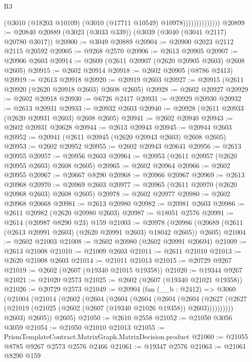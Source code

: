 \begin{lexlean}{R3}
\begin{coremodule}
                            (@3010 (@18203 @10109) (@3010 (@17711 @10549) @10978))))))))))))))
@20899 := @20840 @20889 (@3023 (@3033 @339)) (@3039 (@3040 (@3041 @2117) @20780 @3017))
@20900 := @3049 @20889
@20904 := @20900 @2023 @2112 @2115 @20592
@20905 := @9268 @2570
@20906 := @2613 @20905
@20907 := @20906 @2603
@20914 := @2609 (@2611 @20907 (@2620 @20905 @2603) @2608 @2605)
@20915 := @2602 @20914
@20918 := @2602 @20905 (@8786 @2413)
@20919 := @2613 @20918
@20920 := @20919 @2603
@20927 := @20915 (@2611 @20920 (@2620 @20918 @2603) @2608 @2605)
@20928 := @2602 @20927
@20929 := @2602 @20918
@20930 := @6726 @2417
@20931 := @20929 @20930
@20932 := @2613 @20931
@20933 := @20932 @2603
@20940 := @20928 (@2611 @20933 (@2620 @20931 @2603) @2608 @2605)
@20941 := @2602 @20940
@20943 := @2602 @20931 @20628
@20944 := @2613 @20943
@20945 := @20944 @2603
@20952 := @20941 (@2611 @20945 (@2620 @20943 @2603) @2608 @2605)
@20953 := @2602 @20952
@20955 := @2602 @20943 @20641
@20956 := @2613 @20955
@20957 := @20956 @2603
@20964 := @20953 (@2611 @20957 (@2620 @20955 @2603) @2608 @2605)
@20965 := @2602 @20964
@20966 := @2602 @20955
@20967 := @20667 @8290
@20968 := @20966 @20967
@20969 := @2613 @20968
@20970 := @20969 @2603
@20977 := @20965 (@2611 @20970 (@2620 @20968 @2603) @2608 @2605)
@20978 := @2602 @20977
@20980 := @2602 @20968 @20668
@20981 := @2613 @20980
@20982 := @20981 @2603
@20986 := @2611 @20982 (@2620 @20980 @2603)
@20987 := @18051 @2576
@20991 := @2614 (@20987 @8290 @23) @159
@21003 := @20978
    (@20986 (@20689 (@2611 (@2613 @20991 @2603) (@2620 @20991 @2603) @18042 @2605)) @2605)
@21004 := @2602 @21003
@21008 := @2602 @20980 (@2602 @20991 @20694)
@21009 := @2613 @21008
@21010 := @21009 @2603
@21011 := @2611 @21010
@21013 := @2620 @21008 @2603
@21014 := @21011 @21013
@21015 := @20729 @9267
@21019 := @2602 (@2607 (@19340 @21015 @19358))
@21020 := @19344 @9267
@21021 := @21020 @2573
@21025 := @2602 (@2607 (@19340 @21021 @19358))
@21026 := @20729 @2573
@21049 := @20904
    (fun (__b : @2412) =>
    @3060
      (@21004
        (@21014
          (@2602
            (@2604
              (@2604
                (@2604
                  (@2604
                    (@2604
                      (@2627
                        (@2627 (@21019 (@21025 (@2602 (@2607 (@19340 @21026 @19358)) @2603))))))))))
            @2603)
          @2605))
      @2605)
@21050 := @2610 @2558
@21052 := @21050 @3056 @3059
@21054 := @21050 @21010 @21013
@21055 := PrismTemplateContract.MatrixGraph.MatrixDecision.product
@21060 := @21055 @8785 @9267 @2573 @2576 @2466
@21061 := @19347 @2576
@21063 := @21061 @8290 @159

\end{coremodule}
\end{lexlean}
